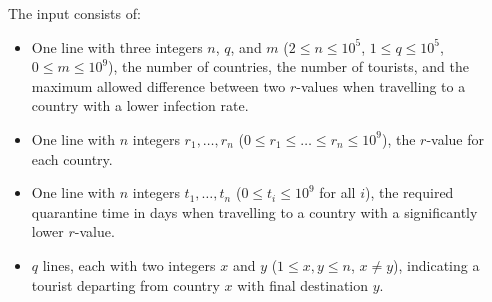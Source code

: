 
	The input consists of:
	\begin{itemize}
		\item One line with three integers $n$, $q$, and $m$
			($2\leq n \leq 10^5$, $1\leq q \leq 10^5$, $0\leq m \leq 10^9$),
			the number of countries,
			the number of tourists, and
			the maximum allowed difference between two $r$-values
			when travelling to a country with a lower infection rate.
		\item One line with $n$ integers $r_1, \dots, r_n$
			($0 \leq r_1 \leq \dots \leq r_n \leq 10^9$), the $r$-value for each country.
		\item One line with $n$ integers $t_1, \dots, t_n$ ($0 \leq t_i \leq 10^9$ for all $i$),
			the required quarantine time in days when travelling to a country with a significantly lower $r$-value.
		\item $q$ lines, each with two integers $x$ and $y$ ($1 \leq x, y \leq n$, $x \neq y$),
			indicating a tourist departing from country $x$ with final destination $y$.
	\end{itemize}
